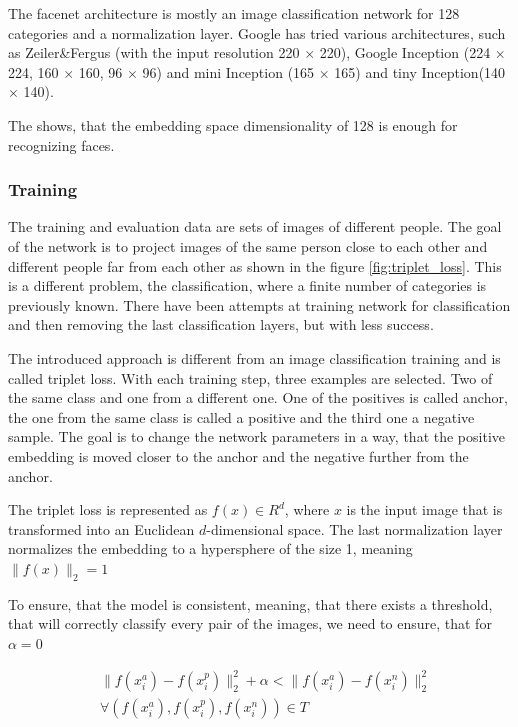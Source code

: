 \documentclass[a4paper,11pt,titlepage,twoside]{article}
\numberwithin{figure}{section}
\begin{document}
The facenet architecture is mostly an image classification network for 128 categories and a normalization layer. Google has tried various architectures, such as Zeiler\&Fergus \cite{zeiler2014visualizing} (with the input resolution 220 $\times$ 220), Google Inception \cite{szegedy2015going} (224 $\times$ 224, 160 $\times$ 160, 96 $\times$ 96) and mini Inception (165 $\times$ 165) and tiny Inception(140 $\times$ 140). 


The \cite{szegedy2015going} shows, that the embedding space dimensionality of 128 is enough for recognizing faces.

\subsubsection{Training}
The training and evaluation data are sets of images of different people. The goal of the network is to project images of the same person close to each other and different people far from each other as shown in the figure \ref{fig:triplet_loss}. This is a different problem, the classification, where a finite number of categories is previously known. There have been attempts \cite{wst2008deeply, taigman2014deepface}  at training network for classification and then removing the last classification layers, but with less success.

The introduced approach is different from an image classification training and is called triplet loss. With each training step, three examples are selected. Two of the same class and one from a different one. One of the positives is called anchor, the one from the same class is called a positive and the third one a negative sample. The goal is to change the network parameters in a way, that the positive embedding is moved closer to the anchor and the negative further from the anchor.

The triplet loss is represented as $f(x) \in R^d$, where $x$ is the input image that is transformed into an Euclidean $d$-dimensional space. The last normalization layer normalizes the embedding to a hypersphere of the size 1, meaning $\|f(x)\|_2 = 1$ 

To ensure, that the model is consistent, meaning, that there exists a threshold, that will correctly classify every pair of the images, we need to ensure, that for $\alpha = 0$

\begin{equation}
\begin{aligned}
&\|f(x_i^a) - f(x_i^p)\|^2_2 + \alpha < \|f(x_i^a) - f(x_i^n)\|^2_2 \\
&\forall (f(x_i^a), f(x_i^p), f(x_i^n)) \in T
\end{aligned}
\end{equation}
\end{document}
